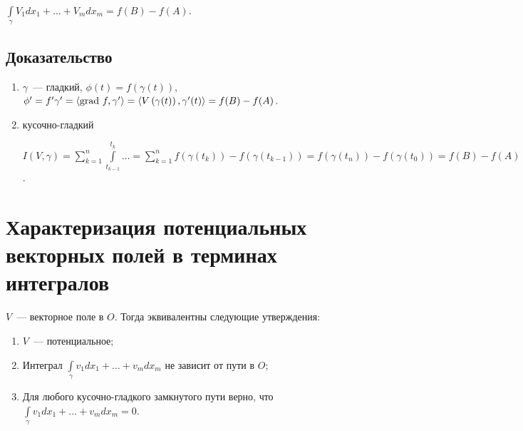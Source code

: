 \documentclass{article}
\begin{document}
        $\int\limits_{\gamma} V_1 dx_1 + \ldots + V_m dx_m = f(B) - f(A)$.
        
        \subsection{Доказательство}
        
            \begin{enumerate}
            
                \item $\gamma$~--- гладкий, $\phi(t) = f(\gamma(t))$, $\phi' = f' \gamma' = \langle \grad f, \gamma' \rangle = \langle V \left( \gamma(t) \right), \gamma'(t) \rangle = f(B) - f(A)$.
                
                \item кусочно-гладкий
                
                    $I \left( V, \gamma \right) = \sum\limits^n_{k = 1} \int\limits^{t_k}_{t_{k - 1}} \ldots = \sum\limits^n_{k = 1} f \left( \gamma (t_k) \right) - f \left( \gamma ( t_{k - 1} ) \right) = f(\gamma(t_n)) - f(\gamma(t_0)) = f(B) - f(A)$.
                    
            \end{enumerate}
            
    \newpage
    
    \section{Характеризация потенциальных векторных полей в терминах интегралов}
    
        $V$~--- векторное поле в $O$. Тогда эквивалентны следующие утверждения:
        
        \begin{enumerate}
        
            \item $V$~--- потенциальное;
            
            \item Интеграл $\int\limits_{\gamma} v_1 dx_1 + \ldots + v_m dx_m$ не зависит от пути в $O$;
            
            \item Для любого кусочно-гладкого замкнутого пути верно, что $\int\limits_{\gamma} v_1 dx_1 + \ldots + v_m dx_m = 0$.
            
        \end{enumerate}
            
\end{document}
